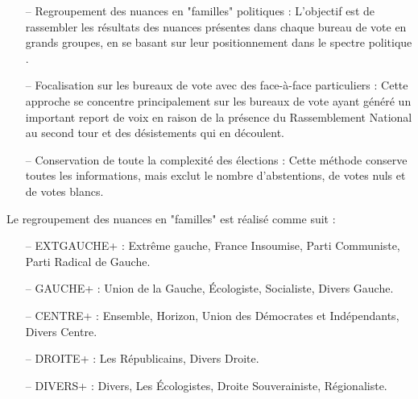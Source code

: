 \documentclass[11pt]{article}
\begin{document}
            \begin{itemize}
                \item[--] Regroupement des nuances en "familles" politiques : L'objectif est de rassembler les résultats des nuances présentes dans chaque bureau de vote en grands groupes, en se basant sur leur positionnement dans le spectre politique \cite{Wikipédia_2024b}. 
                \item[--] Focalisation sur les bureaux de vote avec des face-à-face particuliers : Cette approche se concentre principalement sur les bureaux de vote ayant généré un important report de voix en raison de la présence du Rassemblement National au second tour et des désistements qui en découlent. 
                \item[--] Conservation de toute la complexité des élections : Cette méthode conserve toutes les informations, mais exclut le nombre d'abstentions, de votes nuls et de votes blancs. 
            \end{itemize}
        
            \noindent Le regroupement des nuances en "familles" est réalisé comme suit : 
            \begin{itemize} 
                \item[--] EXTGAUCHE+ : Extrême gauche, France Insoumise, Parti Communiste, Parti Radical de Gauche. 
                \item[--] GAUCHE+ : Union de la Gauche, Écologiste, Socialiste, Divers Gauche. 
                \item[--] CENTRE+ : Ensemble, Horizon, Union des Démocrates et Indépendants, Divers Centre. 
                \item[--] DROITE+ : Les Républicains, Divers Droite. 
                \item[--] DIVERS+ : Divers, Les Écologistes, Droite Souverainiste, Régionaliste. 
            \end{itemize}
\end{document}
